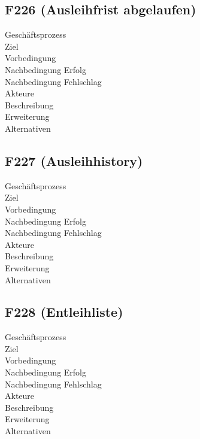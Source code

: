 \subsection{F226 (Ausleihfrist abgelaufen)}
\begin{description}
  \item[Geschäftsprozess]
  \item[Ziel]
  \item[Vorbedingung]
  \item[Nachbedingung Erfolg]
  \item[Nachbedingung Fehlschlag]
  \item[Akteure]
  \item[Beschreibung]
  \item[Erweiterung]
  \item[Alternativen]
\end{description}

\subsection{F227 (Ausleihhistory)}
\begin{description}
  \item[Geschäftsprozess]
  \item[Ziel]
  \item[Vorbedingung]
  \item[Nachbedingung Erfolg]
  \item[Nachbedingung Fehlschlag]
  \item[Akteure]
  \item[Beschreibung]
  \item[Erweiterung]
  \item[Alternativen]
\end{description}

\subsection{F228 (Entleihliste)}
\begin{description}
  \item[Geschäftsprozess]
  \item[Ziel]
  \item[Vorbedingung]
  \item[Nachbedingung Erfolg]
  \item[Nachbedingung Fehlschlag]
  \item[Akteure]
  \item[Beschreibung]
  \item[Erweiterung]
  \item[Alternativen]
\end{description}

